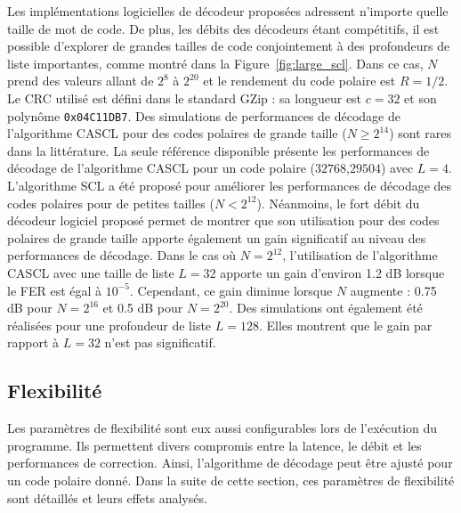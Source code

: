 Les implémentations logicielles de décodeur proposées adressent n'importe quelle taille de mot de code. De plus, les débits des décodeurs étant compétitifs, il est possible d'explorer de grandes tailles de code conjointement à des profondeurs de liste importantes, comme montré dans la Figure~\ref{fig:large_scl}. Dans ce cas, $N$ prend des valeurs allant de $2^8$ à $2^{20}$ et le rendement du code polaire est $R=1/2$. Le CRC utilisé est défini dans le standard GZip : sa longueur est $c=32$ et son polynôme \texttt{0x04C11DB7}. 
Des simulations de performances de décodage de l'algorithme CASCL pour des codes polaires de grande taille ($N \geq 2^{14}$) sont rares dans la littérature. La seule référence disponible présente les performances de décodage de l'algorithme CASCL pour un code polaire ($32768$,$29504$) avec $L=4$.
L'algorithme SCL a été proposé pour améliorer les performances de décodage des codes polaires pour de petites tailles ($N<2^{12}$). Néanmoins, le fort débit du décodeur logiciel proposé permet de montrer que son utilisation pour des codes polaires de grande taille apporte également un gain significatif au niveau des performances de décodage. Dans le cas où $N=2^{12}$, l'utilisation de l'algorithme CASCL avec une taille de liste $L=32$ apporte un gain d'environ 1.2 dB lorsque le FER est égal à $10^{-5}$. Cependant, ce gain diminue lorsque $N$ augmente : 0.75 dB pour $N=2^{16}$ et 0.5 dB pour $N=2^{20}$. Des simulations ont également été réalisées pour une profondeur de liste $L=128$. Elles montrent que le gain par rapport à $L=32$ n'est pas significatif.

\subsection{Flexibilité}
Les paramètres de flexibilité sont eux aussi configurables lors de l'exécution du programme. Ils permettent divers compromis entre la latence, le débit et les performances de correction. Ainsi, l'algorithme de décodage peut être ajusté pour un code polaire donné. Dans la suite de cette section, ces paramètres de flexibilité sont détaillés et leurs effets analysés.


